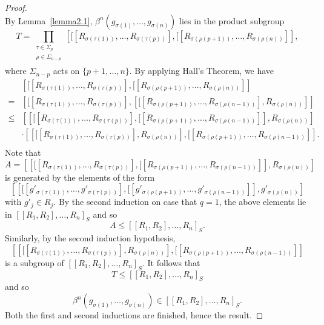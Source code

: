 \documentclass[10pt]{amsart}
\numberwithin{equation}{section}
\begin{document}
\begin{proof}
$$$$
By Lemma~\ref{lemma2.1}, $\beta^{n}(g_{\sigma(1)},\ldots,g_{\sigma(n)})$ lies in the product subgroup
$$
T=\prod\limits_{
\begin{array}{c}
\tau\in\Sigma_p\\
\rho\in\Sigma_{n-p}\\
\end{array}}
\left[[[R_{\sigma(\tau(1))},\ldots,R_{\sigma(\tau(p))}], [[R_{\sigma(\rho(p+1))},\ldots,R_{\sigma(\rho(n))}]\right],
$$
where $\Sigma_{n-p}$ acts on $\{p+1,\ldots,n\}$. By applying Hall's Theorem, we have
$$
\begin{array}{rl}
&\left[[[R_{\sigma(\tau(1))},\ldots,R_{\sigma(\tau(p))}], [[R_{\sigma(\rho(p+1))},\ldots,R_{\sigma(\rho(n))}]\right]\\
=&\left[[[R_{\sigma(\tau(1))},\ldots,R_{\sigma(\tau(p))}], \left[[[R_{\sigma(\rho(p+1))},\ldots, R_{\sigma(\rho(n-1))}],R_{\sigma(\rho(n))}\right]\right]\\
\leq &\left[\left[[[R_{\sigma(\tau(1))},\ldots,R_{\sigma(\tau(p))}], [[R_{\sigma(\rho(p+1))},\ldots, R_{\sigma(\rho(n-1))}]\right],R_{\sigma(\rho(n))}\right]\\
&\cdot\left[ \left[[[R_{\sigma(\tau(1))},\ldots,R_{\sigma(\tau(p))}],R_{\sigma(\rho(n))}\right], [[R_{\sigma(\rho(p+1))},\ldots, R_{\sigma(\rho(n-1))}]\right].\\
\end{array}
$$
Note that $A=\left[\left[[[R_{\sigma(\tau(1))},\ldots,R_{\sigma(\tau(p))}], [[R_{\sigma(\rho(p+1))},\ldots, R_{\sigma(\rho(n-1))}]\right],R_{\sigma(\rho(n))}\right]$ is generated by the elements of the form
$$
\left[\left[[[g'_{\sigma(\tau(1))},\ldots,g'_{\sigma(\tau(p))}], [[g'_{\sigma(\rho(p+1))},\ldots, g'_{\sigma(\rho(n-1))}]\right],g'_{\sigma(\rho(n))}\right]
$$
with $g'_j\in R_j$. By the second induction on case that $q=1$, the above elements lie in
$[[R_1,R_2],\ldots,R_n]_S$ and so
$$
A\leq [[R_1,R_2],\ldots,R_n]_S.
$$
Similarly, by the second induction hypothesis, $$\left[ \left[[[R_{\sigma(\tau(1))},\ldots,R_{\sigma(\tau(p))}],R_{\sigma(\rho(n))}\right], [[R_{\sigma(\rho(p+1))},\ldots, R_{\sigma(\rho(n-1))}]\right]$$ is a subgroup of $[[R_1,R_2],\ldots,R_n]_S$. It follows that
$$
T\leq [[R_1,R_2],\ldots,R_n]_S
$$
and so
$$
\beta^{n}(g_{\sigma(1)},\ldots,g_{\sigma(n)})\in [[R_1,R_2],\ldots,R_n]_S.
$$
Both the first and second inductions are finished, hence the result.
\end{proof}
\end{document}

